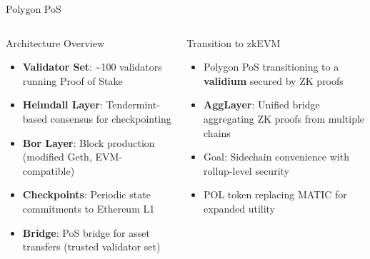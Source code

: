 \documentclass[8pt,aspectratio=169]{beamer}
\begin{document}
\begin{frame}{Polygon PoS}
\vspace{-1mm}
\begin{columns}[T]
\begin{block}{Architecture Overview}
\footnotesize
\begin{itemize}\setlength\itemsep{3pt}
  \item \textbf{Validator Set}: \textasciitilde100 validators running Proof of Stake
  \item \textbf{Heimdall Layer}: Tendermint-based consensus for checkpointing
  \item \textbf{Bor Layer}: Block production (modified Geth, EVM-compatible)
  \item \textbf{Checkpoints}: Periodic state commitments to Ethereum L1
  \item \textbf{Bridge}: PoS bridge for asset transfers (trusted validator set)
\end{itemize}
\end{block}
\vspace{2mm}
\begin{block}{Transition to zkEVM}
\footnotesize
\begin{itemize}
  \item Polygon PoS transitioning to a \textbf{validium} secured by ZK proofs
  \item \textbf{AggLayer}: Unified bridge aggregating ZK proofs from multiple chains
  \item Goal: Sidechain convenience with rollup-level security
  \item POL token replacing MATIC for expanded utility
\end{itemize}
\end{block}
\vspace{1mm}
\end{columns}
\end{frame}
\end{document}
